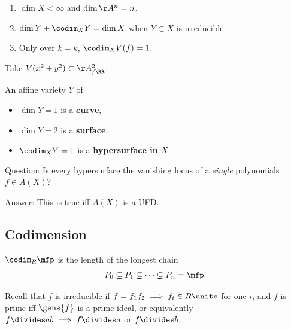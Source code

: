 \begin{enumerate}
\def\labelenumi{\arabic{enumi}.}
\tightlist
\item
  \(\dim X<\infty\) and \(\dim \AA^n = n\).
\item
  \(\dim Y + \codim_X Y = \dim X\) when \(Y\subset X\) is irreducible.
\item
  Only over \(\bar k = k\), \(\codim_X V(f) = 1\).
\end{enumerate}

\begin{example}

Take \(V(x^2+y^2) \subset \AA^2_{/\RR}\).

\end{example}

\begin{definition}

An affine variety \(Y\) of

\begin{itemize}
\tightlist
\item
  \(\dim Y = 1\) is a \textbf{curve},
\item
  \(\dim Y = 2\) is a \textbf{surface},
\item
  \(\codim_X Y = 1\) is a \textbf{hypersurface in \(X\)}
\end{itemize}

\end{definition}

Question: Is every hypersurface the vanishing locus of a \emph{single}
polynomials \(f\in A(X)\)?

Answer: This is true iff \(A(X)\) is a UFD.

\hypertarget{codimension}{%
\subsection{Codimension}\label{codimension}}

\begin{definition}

\(\codim_R \mfp\) is the length of the longest chain
\begin{align*}P_0 \subsetneq P_1 \subsetneq \cdots \subsetneq P_n = \mfp.\end{align*}

\end{definition}

Recall that \(f\) is irreducible if
\(f = f_1 f_2 \implies f_i \in R\units\) for one \(i\), and \(f\) is
prime iff \(\gens{f}\) is a prime ideal, or equivalently
\(f\divides ab \implies f\divides a\) or \(f\divides b\).

